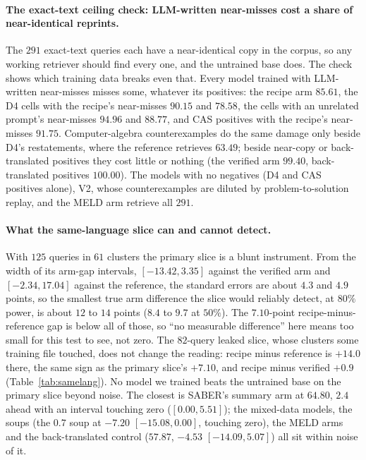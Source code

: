 \paragraph{The exact-text ceiling check: LLM-written near-misses cost a share of near-identical reprints.}
The $291$ exact-text queries each have a near-identical copy in the corpus, so any working retriever should find every one, and the untrained base does. The check shows which training data breaks even that. Every model trained with LLM-written near-misses misses some, whatever its positives: the recipe arm $85.61$, the D4 cells with the recipe's near-misses $90.15$ and $78.58$, the cells with an unrelated prompt's near-misses $94.96$ and $88.77$, and CAS positives with the recipe's near-misses $91.75$. Computer-algebra counterexamples do the same damage only beside D4's restatements, where the reference retrieves $63.49$; beside near-copy or back-translated positives they cost little or nothing (the verified arm $99.40$, back-translated positives $100.00$). The models with no negatives (D4 and CAS positives alone), V2, whose counterexamples are diluted by problem-to-solution replay, and the MELD arm retrieve all $291$.

\paragraph{What the same-language slice can and cannot detect.}
With $125$ queries in $61$ clusters the primary slice is a blunt instrument. From the width of its arm-gap intervals, $[-13.42, 3.35]$ against the verified arm and $[-2.34, 17.04]$ against the reference, the standard errors are about $4.3$ and $4.9$ points, so the smallest true arm difference the slice would reliably detect, at $80\%$ power, is about $12$ to $14$ points ($8.4$ to $9.7$ at $50\%$). The $7.10$-point recipe-minus-reference gap is below all of those, so ``no measurable difference'' here means too small for this test to see, not zero. The $82$-query leaked slice, whose clusters some training file touched, does not change the reading: recipe minus reference is $+14.0$ there, the same sign as the primary slice's $+7.10$, and recipe minus verified $+0.9$ (Table~\ref{tab:samelang}). No model we trained beats the untrained base on the primary slice beyond noise. The closest is SABER's summary arm at $64.80$, $2.4$ ahead with an interval touching zero ($[0.00, 5.51]$); the mixed-data models, the soups (the $0.7$ soup at $-7.20$ $[-15.08, 0.00]$, touching zero), the MELD arms and the back-translated control ($57.87$, $-4.53$ $[-14.09, 5.07]$) all sit within noise of it.

